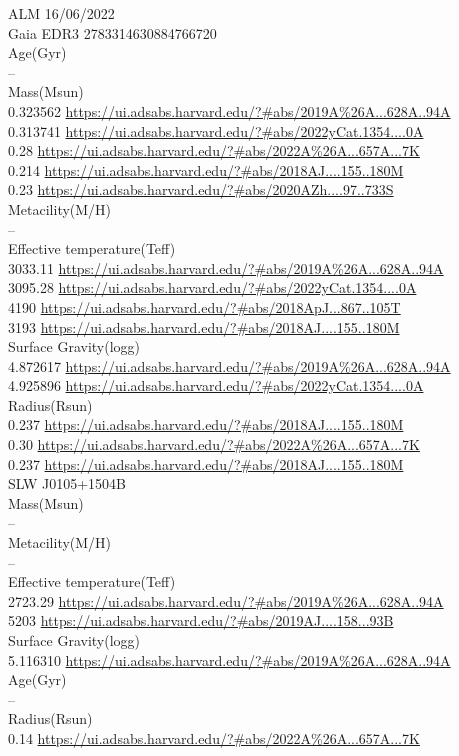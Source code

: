 ALM 16/06/2022\\
Gaia EDR3 2783314630884766720\\
Age(Gyr)\\
--\\
Mass(Msun)\\
0.323562 \url{https://ui.adsabs.harvard.edu/?#abs/2019A%26A...628A..94A}\\
0.313741 \url{https://ui.adsabs.harvard.edu/?#abs/2022yCat.1354....0A}\\
0.28 \url{https://ui.adsabs.harvard.edu/?#abs/2022A%26A...657A...7K}\\
0.214 \url{https://ui.adsabs.harvard.edu/?#abs/2018AJ....155..180M}\\
0.23 \url{https://ui.adsabs.harvard.edu/?#abs/2020AZh....97..733S}\\
Metacility(M/H)\\
--\\
Effective temperature(Teff)\\
3033.11 \url{https://ui.adsabs.harvard.edu/?#abs/2019A%26A...628A..94A}\\
3095.28 \url{https://ui.adsabs.harvard.edu/?#abs/2022yCat.1354....0A}\\
4190 \url{https://ui.adsabs.harvard.edu/?#abs/2018ApJ...867..105T}\\
3193 \url{https://ui.adsabs.harvard.edu/?#abs/2018AJ....155..180M}\\
Surface Gravity(logg)\\
4.872617 \url{https://ui.adsabs.harvard.edu/?#abs/2019A%26A...628A..94A}\\
4.925896 \url{https://ui.adsabs.harvard.edu/?#abs/2022yCat.1354....0A}\\
Radius(Rsun)\\
0.237 \url{https://ui.adsabs.harvard.edu/?#abs/2018AJ....155..180M}\\
0.30 \url{https://ui.adsabs.harvard.edu/?#abs/2022A%26A...657A...7K}\\
0.237 \url{https://ui.adsabs.harvard.edu/?#abs/2018AJ....155..180M}\\
SLW J0105+1504B\\
Mass(Msun)\\
--\\
Metacility(M/H)\\
--\\
Effective temperature(Teff)\\
2723.29 \url{https://ui.adsabs.harvard.edu/?#abs/2019A%26A...628A..94A}\\
5203 \url{https://ui.adsabs.harvard.edu/?#abs/2019AJ....158...93B}\\
Surface Gravity(logg)\\
5.116310 \url{https://ui.adsabs.harvard.edu/?#abs/2019A%26A...628A..94A}\\
Age(Gyr)\\
--\\
Radius(Rsun)\\
0.14 \url{https://ui.adsabs.harvard.edu/?#abs/2022A%26A...657A...7K}\\